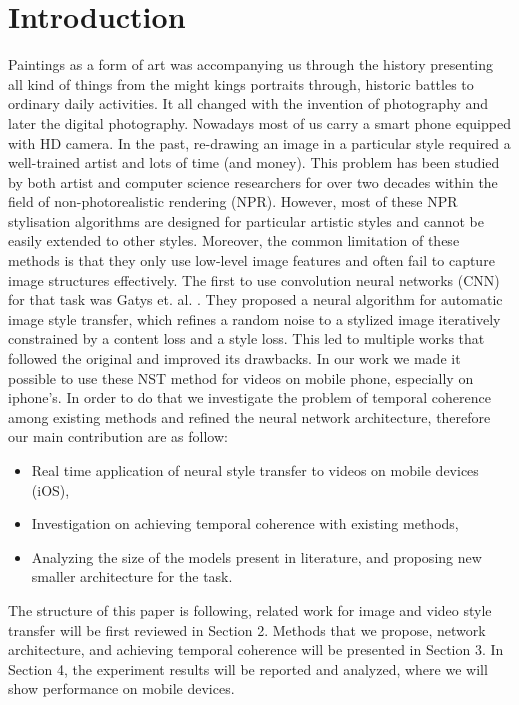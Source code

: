 \documentclass[a4paper,conference]{IEEEtran}
\begin{document}

\section{Introduction}

Paintings as a form of art was  accompanying us through the history presenting all kind of things from the might kings portraits through, historic battles to ordinary daily activities. It all changed with the invention of photography and later the digital photography. Nowadays most of us carry a smart phone equipped with HD camera. In the past, re-drawing an image in a particular style required a well-trained artist and lots of time (and money).  This problem has been studied by both artist and computer science researchers for over two decades within the field of non-photorealistic rendering (NPR). However, most of these NPR stylisation algorithms are designed for particular artistic styles and cannot be easily extended to other styles. Moreover, the common limitation of these methods is that they only use low-level image features and often fail to capture image structures effectively. The first to use convolution neural networks (CNN) for that task was Gatys et. al. \cite{Gatys2016ImageST,GatysEB15archivix}. They proposed a neural algorithm for automatic image style transfer, which refines a random noise to a stylized image iteratively constrained by a content loss and a style loss. This led to multiple works that followed the original and improved its drawbacks. In our work we made it possible to use these NST method for videos on mobile phone, especially on iphone's. In order to do that we investigate the problem of temporal coherence among existing methods and refined the neural network architecture, therefore  our main contribution are as follow:

\begin{itemize}
\item Real time application of neural style transfer to videos on mobile devices (iOS),
\item Investigation on achieving temporal coherence with existing methods,
\item Analyzing the size of the models present in literature, and proposing new smaller architecture for the task.
\end{itemize}

The structure of this paper is following, related work for image and video style transfer will be first reviewed in Section 2. Methods that we propose, network architecture, and achieving temporal coherence will be presented in Section 3. In Section 4, the experiment results will be reported and analyzed, where we will show performance on mobile devices.
\end{document}
